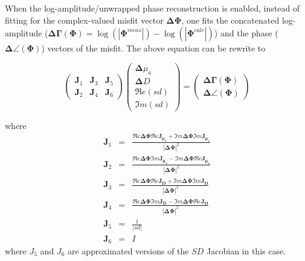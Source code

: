 \documentclass{article}
\begin{document}
When the log-amplitude/unwrapped phase reconstruction is enabled, instead of fitting for 
the complex-valued misfit vector $\boldsymbol{\Delta\Phi}$, one fits the concatenated log-amplitude ($\boldsymbol{\Delta\Gamma(\Phi)}=\log(|\boldsymbol{\Phi}^{meas}|)-\log(|\boldsymbol{\Phi}^{calc}|)$) and the phase ($\boldsymbol{\Delta\angle(\Phi)}$)
vectors of the misfit. The above equation can be rewrite to

\begin{equation}\label{eq:logphase}
\left(
\begin{array}{lll}
\mathbf{J}_1 & \mathbf{J}_3 & \mathbf{J}_5\\
\mathbf{J}_2 & \mathbf{J}_4 & \mathbf{J}_6
\end{array}\right)
\left(
\begin{array}{l}
\boldsymbol{\Delta}{\mu_a}\\
\boldsymbol{\Delta}{D}\\
\Re e({sd})\\
\Im m({sd})
\end{array}
\right)=\left(
\begin{array}{l}
{\boldsymbol{\Delta\Gamma(\Phi)}}\\
{\boldsymbol{\Delta\angle(\Phi)}}
\end{array}\right)
\end{equation}

where
\begin{eqnarray}\nonumber
\mathbf{J}_1&=&\frac{\Re e{\boldsymbol{\Delta\Phi}}\Re e{\boldsymbol{\mathbf{J}_{\mu_a}}}
+\Im m{\boldsymbol{\Delta\Phi}}\Im m{\boldsymbol{\mathbf{J}_{\mu_a}}} }{|\boldsymbol{\Delta\Phi}|^2} \\\nonumber
\mathbf{J}_2&=&\frac{\Re e{\boldsymbol{\Delta\Phi}}\Im m{\boldsymbol{\mathbf{J}_{\mu_a}}}
-\Im m{\boldsymbol{\Delta\Phi}}\Re e{\boldsymbol{\mathbf{J}_{\mu_a}}} }{|\boldsymbol{\Delta\Phi}|^2} \\
\mathbf{J}_3&=&\frac{\Re e{\boldsymbol{\Delta\Phi}}\Re e{\boldsymbol{\mathbf{J}_{D}}}
+\Im m{\boldsymbol{\Delta\Phi}}\Im m{\boldsymbol{\mathbf{J}_{D}}} }{|\boldsymbol{\Delta\Phi}|^2} \\\nonumber
\mathbf{J}_4&=&\frac{\Re e{\boldsymbol{\Delta\Phi}}\Im m{\boldsymbol{\mathbf{J}_{D}}}
-\Im m{\boldsymbol{\Delta\Phi}}\Re e{\boldsymbol{\mathbf{J}_{D}}} }{|\boldsymbol{\Delta\Phi}|^2} \\\nonumber
\mathbf{J}_5&=& \frac{1}{|sd|} \\\nonumber
\mathbf{J}_6&=& I \nonumber
\end{eqnarray}
where $J_5$ and $J_6$ are approximated versions of the $SD$ Jacobian in this case.
\end{document}

